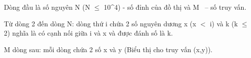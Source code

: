 Dòng đầu là số nguyên N (N  $\le$  10^4) - số đỉnh của đồ thị và M  – số truy vấn.

Từ dòng 2 đến dòng N: dòng thứ i chứa 2 số nguyên dương x (x $<$ i) và k (k  $\le$  2) nghĩa là có cạnh nối giữa i và x và được đánh số là k.

M dòng sau: mỗi dòng chứa 2 số x và y (Biểu thị cho truy vấn (x,y)).

\